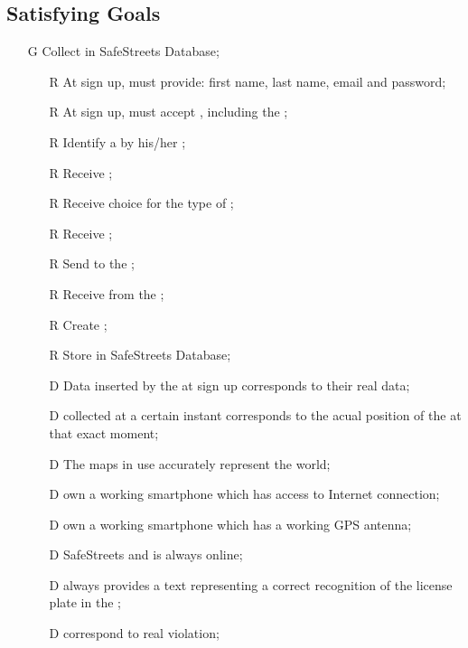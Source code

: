 \documentclass[../../../rasd.tex]{subfiles}
\begin{document}
\subsection{Satisfying Goals\label{sect:3.2.6}}
\begin{itemize}
	\item[G\subs{1}]Collect  in SafeStreets Database;
	\begin{itemize}
		\item[R\subs{1}]At sign up,  must provide: first name, last name, email and password;
		\item[R\subs{2}]At sign up,  must accept , including the ;
		\item[R\subs{3}]Identify a  by his/her ;
		\item[R\subs{4}]Receive ;
		\item[R\subs{5}]Receive  choice for the type of ;
		\item[R\subs{6}]Receive ;
		\item[R\subs{7}]Send  to the ;
		\item[R\subs{8}]Receive  from the ;
		\item[R\subs{9}]Create ;
		\item[R\subs{10}]Store  in SafeStreets Database;
		\\
		\item[D\subs{1}]Data inserted by the  at sign up corresponds to their real data;
		\item[D\subs{2}] collected at a certain instant corresponds to the acual position of the  at that exact moment;
		\item[D\subs{3}]The maps in use accurately represent the world;
		\item[D\subs{4}] own a working smartphone which has access to Internet connection;
		\item[D\subs{5}] own a working smartphone which has a working GPS antenna;
		\item[D\subs{6}]SafeStreets and  is always online;
		\item[D\subs{7}] always provides a text representing a correct recognition of the license plate in the ;
		\item[D\subs{9}] correspond to real violation;
	\end{itemize}


\end{itemize}
\end{document}

